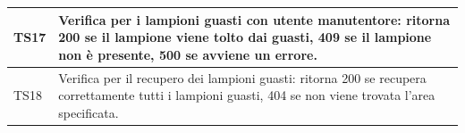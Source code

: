 \documentclass[a4paper, 12pt]{article}
\begin{document}
\begin{center}
\begin{tabularx}{\textwidth}{|X|X|}
		\hline
		TS17 & Verifica per i lampioni guasti con utente manutentore: ritorna 200 se il lampione viene tolto dai guasti, 409 se il lampione non è presente, 500 se avviene un errore.                                                                                        \\
		\hline
		TS18 & Verifica per  il recupero dei lampioni guasti: ritorna  200 se recupera correttamente tutti i lampioni guasti, 404 se non viene trovata l'area specificata.                                                                                                   \\
		\hline
	\end{tabularx}\\
	\mbox{}\\
\end{center}
\end{document}
